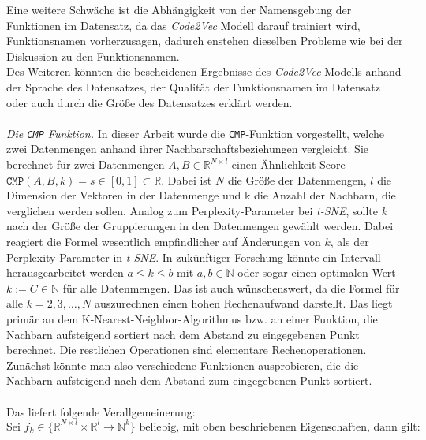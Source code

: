 \documentclass[12pt,letterpaper,ngerman]{article}
\begin{document}
Eine weitere Schwäche ist die Abhängigkeit von der Namensgebung 
der Funktionen im Datensatz, da das \textit{Code2Vec} Modell 
darauf trainiert wird, Funktionsnamen vorherzusagen, dadurch 
enstehen dieselben Probleme wie bei der Diskussion zu 
den Funktionsnamen.\\
Des Weiteren könnten die bescheidenen Ergebnisse des 
\textit{Code2Vec}-Modells anhand der Sprache des Datensatzes,
der Qualität der Funktionsnamen im Datensatz oder auch durch die 
Größe des Datensatzes erklärt werden.\\\\
\textit{Die \texttt{CMP} Funktion.} 
In dieser Arbeit wurde die \texttt{CMP}-Funktion vorgestellt, welche 
zwei Datenmengen anhand ihrer Nachbarschaftsbeziehungen vergleicht.
Sie berechnet für zwei Datenmengen $A,B \in \mathbb{R}^{N\times l}$
einen Ähnlichkeit-Score 
$\texttt{CMP}(A,B,k) = s \in [0,1]\subset \mathbb{R}$.
Dabei ist $N$ die Größe der Datenmengen, $l$ die Dimension der 
Vektoren in der Datenmenge und k die Anzahl der Nachbarn, 
die verglichen werden sollen. Analog zum Perplexity-Parameter
bei \textit{t-SNE}, sollte $k$ nach der Größe der Gruppierungen 
in den Datenmengen gewählt werden. Dabei reagiert die Formel 
wesentlich empfindlicher auf Änderungen von $k$, als der 
Perplexity-Parameter in \textit{t-SNE}. In zukünftiger Forschung 
könnte ein Intervall herausgearbeitet werden $a \le k \le b $ mit
$ a,b \in \mathbb{N}$ oder sogar einen  optimalen Wert 
$k := C\in \mathbb{N}$ für alle Datenmengen.
Das ist auch wünschenswert, da die Formel für 
alle $k = 2,3,\dots, N$ auszurechnen einen hohen Rechenaufwand 
darstellt. Das liegt primär an dem K-Nearest-Neighbor-Algorithmus 
bzw. an einer Funktion, die Nachbarn aufsteigend sortiert nach 
dem Abstand zu eingegebenen Punkt berechnet. Die restlichen 
Operationen sind elementare Rechenoperationen. Zunächst könnte 
man also verschiedene Funktionen ausprobieren, die die Nachbarn 
aufsteigend nach dem Abstand zum eingegebenen Punkt sortiert.
\hfill\\
\pagebreak
\hfill\\
Das liefert folgende Verallgemeinerung:
\[
  \text{Sei  }f_k \in \{\mathbb{R}^{N\times l}
  \times \mathbb{R}^l \to \mathbb{N}^k\} 
  \text{ beliebig, mit oben beschriebenen Eigenschaften, dann gilt:}
\]
\end{document}
